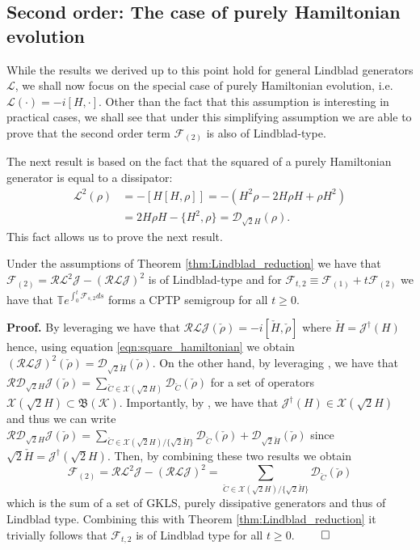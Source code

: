 \documentclass[twocolumn]{autart}    %
\newenvironment{proof}{\textbf{Proof.}}{\hfill $\qed$}
\newcommand{\Dc}{\mathcal{D}}
\newcommand{\Fc}{\mathcal{F}}
\newcommand{\Jc}{\mathcal{J}}
\newcommand{\Kc}{\mathcal{K}}
\newcommand{\Lc}{\mathcal{L}}
\newcommand{\Rc}{\mathcal{R}}
\newcommand{\Xc}{\mathcal{X}}
\newcommand{\Tb}{\mathbb{T}}
\newcommand{\Bf}{\mathfrak{B}}
\begin{document}
\subsection{Second order: The case of purely Hamiltonian evolution}

While the results we derived up to this point hold for general Lindblad generators $\Lc$, we shall now focus on the special case of purely Hamiltonian evolution, i.e. $\Lc(\cdot) = -i[H,\cdot].$ Other than the fact that this assumption is interesting in practical cases, we shall see that under this simplifying assumption we are able to prove that the second order term $\Fc_{(2)}$ is also of Lindblad-type.

The next result is based on the fact that the squared of a purely Hamiltonian generator is equal to a dissipator:
\begin{align}
    \Lc^2(\rho) &= - [H[H,\rho]] = -(H^2\rho - 2H\rho H + \rho H^2)\nonumber \\
    &= 2H\rho H - \{H^2,\rho\} = \Dc_{\sqrt{2}H}(\rho).
    \label{eqn:square_hamiltonian}
\end{align}
This fact allows us to prove the next result.
\begin{thm}
\label{thm:cptp_second_order}
    Under the assumptions of Theorem \ref{thm:Lindblad_reduction} we have that $\Fc_{(2)} = \Rc\Lc^2\Jc - (\Rc \Lc \Jc)^2$ is of Lindblad-type and for $\Fc_{t,2} \equiv \Fc_{(1)} + t \Fc_{(2)}$ we have that $\Tb e^{\int_0^t \Fc_{s,2} ds}$ forms a CPTP semigroup for all $t\geq0$. 
\end{thm}
\begin{proof}
    By leveraging \cite[Proposition 5]{grigoletto2024exact} we have that $\Rc\Lc\Jc(\check{\rho}) = -i[\check{H},\check{\rho}]$ where $\check{H} = \Jc^\dag(H)$ hence, using equation \eqref{eqn:square_hamiltonian} we obtain $(\Rc\Lc\Jc)^2(\check{\rho}) = \Dc_{\sqrt{2}\check{H}}(\check{\rho})$. On the other hand, by leveraging \cite[Proposition 6 and Proposition 7]{grigoletto2025quantummodelreductioncontinuoustime}, we have that $\Rc \Dc_{\sqrt{2}H}\Jc(\check{\rho}) = \sum_{\check{C}\in\Xc(\sqrt{2}H)} \Dc_{\check{C}}(\check{\rho})$ for a set of operators $\Xc(\sqrt{2}H)\subset \Bf(\Kc)$. Importantly, by \cite[Corollary 4]{grigoletto2025quantummodelreductioncontinuoustime}, we have that $\Jc^\dag(H)\in\Xc(\sqrt{2}H)$ and thus we can write $\Rc \Dc_{\sqrt{2}H}\Jc(\check{\rho}) = \sum_{\check{C}\in\Xc(\sqrt{2}H)/\{\sqrt{2}\check{H}\}} \Dc_{\check{C}}(\check{\rho}) + \Dc_{\sqrt{2}\check{H}}(\check{\rho})$ since $\sqrt{2}\check{H} = \Jc^\dag(\sqrt{2}H)$. Then, by combining these two results we obtain 
    \[ \Fc_{(2)} = \Rc\Lc^2\Jc - (\Rc \Lc \Jc)^2 = \sum_{\check{C}\in\Xc(\sqrt{2}H)/\{\sqrt{2}\check{H}\}} \Dc_{\check{C}}(\check{\rho}) \]
    which is the sum of a set of GKLS, purely dissipative generators and thus of Lindblad type. Combining this with Theorem \ref{thm:Lindblad_reduction} it trivially follows that $\Fc_{t,2}$ is of Lindblad type for all $t\geq0$.
\end{proof}
\end{document}
